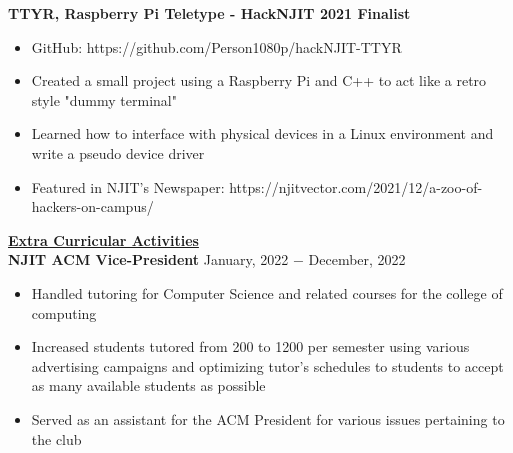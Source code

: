 \documentclass{article}
\begin{document}
\noindent \textbf{TTYR, Raspberry Pi Teletype - HackNJIT 2021 Finalist} 
\begin{itemize}[noitemsep,nolistsep,leftmargin=*]
\item {GitHub: https://github.com/Person1080p/hackNJIT-TTYR}
\item {Created a small project using a Raspberry Pi and C++ to act like a retro style "dummy terminal"}
\item {Learned how to interface with physical devices in a Linux environment and write a pseudo device driver}
\item {Featured in NJIT's Newspaper: https://njitvector.com/2021/12/a-zoo-of-hackers-on-campus/}
\\
\end{itemize}


\noindent \textbf{\underline{Extra Curricular Activities}} \\
\noindent \textbf{NJIT ACM Vice-President} \hfill January, 2022 $-$ December, 2022
\begin{itemize}[noitemsep,nolistsep,leftmargin=*]
\item {Handled tutoring for Computer Science and related courses for the college of computing}
\item {Increased students tutored from 200 to 1200 per semester using various advertising campaigns and optimizing tutor's schedules to students to accept as many available students as possible}
\item {Served as an assistant for the ACM President for various issues pertaining to the club}
\end{itemize}

\end{document}

